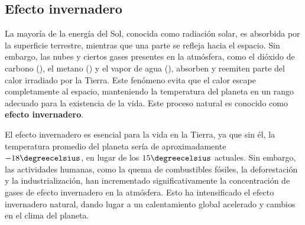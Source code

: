 \subsection{Efecto invernadero}
La mayoría de la energía del Sol, conocida como radiación solar, es absorbida por la superficie terrestre, mientras que una parte se refleja hacia el espacio. Sin embargo, las nubes y ciertos gases presentes en la atmósfera, como el dióxido de carbono (), el metano () y el vapor de agua (), absorben y reemiten parte del calor irradiado por la Tierra. Este fenómeno evita que el calor escape completamente al espacio, manteniendo la temperatura del planeta en un rango adecuado para la existencia de la vida. Este proceso natural es conocido como \textbf{efecto invernadero}.

El efecto invernadero es esencial para la vida en la Tierra, ya que sin él, la temperatura promedio del planeta sería de aproximadamente $-18\degreecelsius$, en lugar de los $15\degreecelsius$ actuales. Sin embargo, las actividades humanas, como la quema de combustibles fósiles, la deforestación y la industrialización, han incrementado significativamente la concentración de gases de efecto invernadero en la atmósfera. Esto ha intensificado el efecto invernadero natural, dando lugar a un calentamiento global acelerado y cambios en el clima del planeta. 

